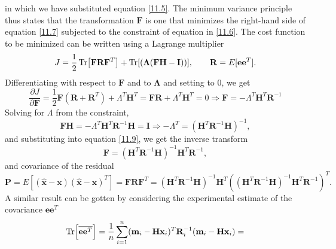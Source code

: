 in which we have substituted equation \ref{11.5}. The minimum variance principle thus states that the transformation $\mathbf{F}$ is one that minimizes the right-hand side of equation \ref{11.7} subjected to the constraint of equation in \ref{11.6}. The cost function to be minimized can be written using a Lagrange multiplier 
\begin{equation}
\label{11.8}
J = \frac{1}{2} \Tr [ \mathbf{F} \mathbf{R} \mathbf{F}^T ] + \Tr[\mathbf{(\Lambda (FH-I))}], \quad \quad \mathbf{R} = E[\mathbf{e}\mathbf{e} ^T].
\end{equation}
Differentiating with respect to $\mathbf{F}$ and to $\mathbf{\Lambda}$ and setting to 0, we get
\begin{equation}
    \label{11.9}
    \frac{\partial J}{\partial \mathbf{F}} = \frac{1}{2}\mathbf{F} (\mathbf{R} + \mathbf{R}^T) + \Lambda^T\mathbf{H}^T = \mathbf{FR} + \Lambda^T \mathbf{H}^T = 0 \Rightarrow \mathbf{F} = - \Lambda^T \mathbf{H} ^T \mathbf{R} ^{-1}
\end{equation}
Solving for $\Lambda$ from the constraint,
\begin{equation}
    \label{11.10}
    \mathbf{FH} = - \Lambda^T \mathbf{H} ^T \mathbf{R} ^{-1} \mathbf{H} = \mathbf{I} \Rightarrow -\Lambda^T = (\mathbf{H} ^T \mathbf{R} ^{-1} \mathbf{H})^{-1},
\end{equation}
and substituting into equation \ref{11.9}, we get the inverse transform
\begin{equation}
    \label{11.11} \boxed{
    \mathbf{F} = (\mathbf{H} ^T \mathbf{R} ^{-1} \mathbf{H})^{-1}\mathbf{H}^T \mathbf{R}^{-1}
    },
\end{equation}
and covariance of the residual
\begin{equation}
    \label{11.12}
    \mathbf{P} = E[(\hat{\mathbf{x}} - \mathbf{x})(\hat{\mathbf{x}} - \mathbf{x})^T] = \mathbf{FRF}^T = (\mathbf{H}^T\mathbf{R}^{-1}\mathbf{H})^{-1}\mathbf{H}^T ((\mathbf{H}^T\mathbf{R}^{-1}\mathbf{H})^{-1}\mathbf{H}^T\mathbf{R}^{-1})^T.
\end{equation}
A similar result can be gotten by considering the experimental estimate of the covariance $\mathbf{e}\mathbf{e}^T$
\begin{equation}
    \label{11.13}
    \Tr[ \overline{\mathbf{ee}^T}] = \frac{1}{n} \sum_{i=1}^n (\mathbf{m}_i - \mathbf{Hx}_i)^T\mathbf{R}_i^{-1}(\mathbf{m}_i - \mathbf{Hx}_i) = 
\end{equation}